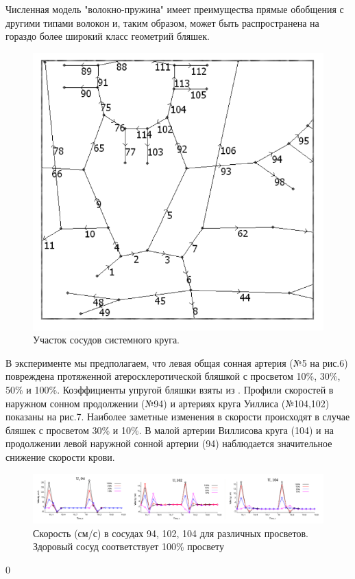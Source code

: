 \documentclass[a4paper, 14pt]{article}
\begin{document}
Численная модель "волокно-пружина" имеет преимущества прямые обобщения с другими 
типами волокон и, таким образом, может быть распространена на гораздо более широкий 
класс геометрий бляшек.

\begin{figure}[h]
\centering
\includegraphics[width=0.4\linewidth]{chast.png}
\caption{Участок сосудов системного круга.}
\label{fig:mpr}
\end{figure}

В эксперименте мы предполагаем, что левая общая сонная артерия (№5 на рис.6) 
повреждена протяженной атеросклеротической бляшкой с просветом 10\%, 30\%, 50\% и 
100\%. Коэффициенты упругой бляшки взяты из \cite{vassilevski:2011}. Профили скоростей в наружном 
сонном продолжении (№94) и артериях круга Уиллиса (№104,102) показаны на рис.7. 
Наиболее заметные изменения в скорости происходят в случае бляшек с просветом 30\% и 
10\%. В малой артерии Виллисова круга (104) и на продолжении левой наружной сонной 
артерии (94) наблюдается значительное снижение скорости крови.

\begin{figure}[h]
\centering
\includegraphics[width=0.9\linewidth]{grap.png}
\caption{Скорость (см/с) в сосудах 94, 102, 104 для различных просветов. Здоровый сосуд
соответствует 100\% просвету}
\label{fig:mpr}
\end{figure}0
\end{document}

